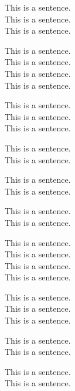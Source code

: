 \documentclass[a4paper, twoside]{report}
\author{Weifan W.}
\date{04/05/2023}
\begin{document}


This is a sentence.\\
This is a sentence.\\
This is a sentence.

This is a sentence.\\
This is a sentence.\\
This is a sentence.\\
This is a sentence.

This is a sentence.\\
This is a sentence.\\
This is a sentence.


This is a sentence.\\
This is a sentence.

This is a sentence.\\
This is a sentence.

This is a sentence.\\
This is a sentence.

This is a sentence.\\
This is a sentence.\\
This is a sentence.\\
This is a sentence.

This is a sentence.\\
This is a sentence.\\
This is a sentence.

This is a sentence.\\
This is a sentence.

This is a sentence.\\
This is a sentence.
\end{document}
